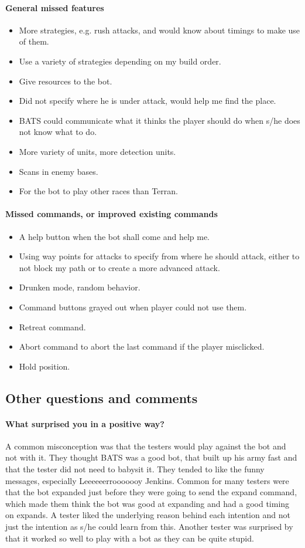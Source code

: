 \paragraph{General missed features}
\begin{itemize}
	\item More strategies, e.g. rush attacks, and would know about timings to make use of them.
	\item Use a variety of strategies depending on my build order.
	\item Give resources to the bot.
	\item Did not specify where he is under attack, would help me find the place.
	\item BATS could communicate what it thinks the player should do when s/he does not know what to do.
	\item More variety of units, more detection units.
	\item Scans in enemy bases.
	\item For the bot to play other races than Terran.
\end{itemize}

\paragraph{Missed commands, or improved existing commands}
\begin{itemize}
	\item A help button when the bot shall come and help me.
	\item Using way points for attacks to specify from where he should attack, either to not block my path or to create a more advanced attack.
	\item Drunken mode, random behavior.
	\item Command buttons grayed out when player could not use them.
	\item Retreat command.
	\item Abort command to abort the last command if the player misclicked.
	\item Hold position.
\end{itemize}

\subsection{Other questions and comments}
\paragraph{What surprised you in a positive way?}
A common misconception was that the testers would play against the bot and not with it. They thought
BATS was a good bot, that built up his army fast and that the tester did not need to babysit it.
They tended to like the funny messages, especially Leeeeeerrooooooy Jenkins. Common for many testers
were that the bot expanded just before they were going to send the expand command, which made them
think the bot was good at expanding and had a good timing on expands. A tester liked the underlying
reason behind each intention and not just the intention as s/he could learn from this. Another
tester was surprised by that it worked so well to play with a bot as they can be quite stupid.


